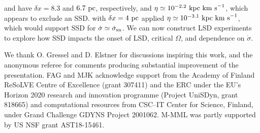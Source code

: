 \documentclass[preprint2]{aastex63}
\newcommand\SNr{\dot\sigma_{\rm sn}}
\newcommand\kpc{~ {\rm kpc}}
\newcommand\pc{~ {\rm pc}}
\newcommand\dx{ {\delta x}}
\newcommand\kms{~ {\rm km~ s}^{-1}}
\begin{document}
 \citet{Gressel:2008} and \citet{GE20} have $\dx=8.3$ and $6.7\pc$,
 respectively, and $\eta\simeq10^{-2.2}\kpc\kms$, which appears to exclude
 an SSD.
 \citet{Gent:2013a} with $\dx=4\pc$ applied $\eta\simeq10^{-3.1}\kpc\kms$,
 which would support SSD for $\dot\sigma\simeq\SNr$.
 {We can now construct LSD experiments to explore how SSD impacts the 
onset of LSD, critical $\Omega$, and dependence on $\dot\sigma$.}   

\acknowledgments
 {We thank O. Gressel and D. Elstner for discussions inspiring this work,
 and the anonymous referee for comments producing substantial improvement of
 the presentation.}
 FAG and MJK acknowledge support from the Academy of Finland
 ReSoLVE Centre of Excellence (grant 307411) and the ERC
 under the EU's Horizon 2020 research and innovation
 programme (Project UniSDyn, grant 818665) and computational
 resources from CSC–IT Center for Science, Finland, under Grand
 Challenge GDYNS Project 2001062. 
 M-MML was partly supported by US NSF grant AST18-15461.

\end{document}
